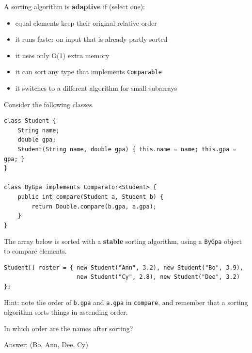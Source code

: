 \begin{question}
A sorting algorithm is \textbf{adaptive} if (select one):
\begin{itemize}[leftmargin=2em,itemsep=1pt,topsep=2pt]
\item[\cb{0}] equal elements keep their original relative order
\item[\cb{1}] it runs faster on input that is already partly sorted
\item[\cb{0}] it uses only O(1) extra memory
\item[\cb{0}] it can sort any type that implements \lstinline|Comparable|
\item[\cb{0}] it switches to a different algorithm for small subarrays
\end{itemize}
\end{question}

\begin{question}
Consider the following classes.

\begin{lstlisting}
class Student {
    String name;
    double gpa;
    Student(String name, double gpa) { this.name = name; this.gpa = gpa; }
}

class ByGpa implements Comparator<Student> {
    public int compare(Student a, Student b) {
        return Double.compare(b.gpa, a.gpa);
    }
}
\end{lstlisting}

The array below is sorted with a \textbf{stable} sorting algorithm, using a \lstinline|ByGpa| object to compare elements.

\begin{lstlisting}
Student[] roster = { new Student("Ann", 3.2), new Student("Bo", 3.9),
                     new Student("Cy", 2.8), new Student("Dee", 3.2) };
\end{lstlisting}

Hint: note the order of \lstinline|b.gpa| and \lstinline|a.gpa| in \lstinline|compare|, and remember that a sorting algorithm sorts things in ascending order.

In which order are the names after sorting?

Answer: \underline{\hspace{2in}} \ifanswers (Bo, Ann, Dee, Cy)\fi
\end{question}

